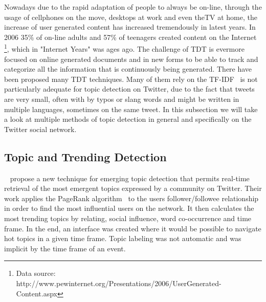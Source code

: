 Nowadays due to the rapid adaptation of people to always be on-line, through the usage of cellphones on the move, desktops at work and even theTV at home, the increase of user generated content has increased tremendously in latest years. In 2006 35\% of on-line adults and 57\% of teenagers created content on the Internet \footnote{ Data source: http://www.pewinternet.org/Presentations/2006/UserGenerated-Content.aspx}, which in "Internet Years" was ages ago. The challenge of \ac{TDT} is evermore focused on online generated documents and in new forms to be able to track and categorize all the information that is continuously being generated.
There have been proposed many \ac{TDT} techniques. Many of them rely on the \ac{TF-IDF}~\cite{Baeza-Yates:1999:MIR:553876} is not particularly adequate for topic detection on Twitter, due to the fact that tweets are very small, often with by typos or slang words and might be written in multiple languages, sometimes on the same tweet. In this subsection we will take a look at multiple methods of topic detection in general and specifically on the Twitter social network.

\subsection{Topic and Trending Detection} 
\label{sub:real_time_topic_and_trending_detection}
~\citet{Cataldi2010} propose a new technique for emerging topic detection that permits real-time retrieval of the most emergent topics expressed by a community on Twitter. Their work applies the PageRank algorithm~\cite{Pagerank1998} to the users follower/followee relationship in order to find the most influential users on the network. It then calculates the most trending topics by relating, social influence, word co-occurrence and time frame. In the end, an interface was created where it would be possible to navigate hot topics in a given time frame. Topic labeling was not automatic and was implicit by the time frame of an event.

